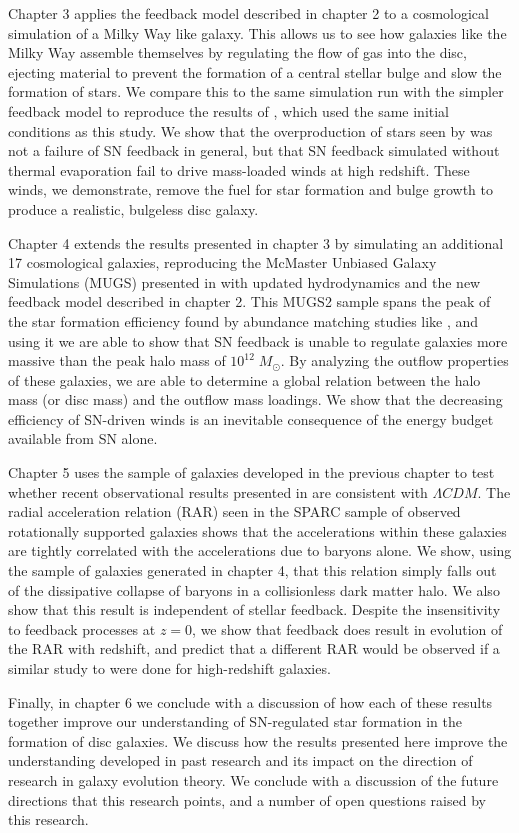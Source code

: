Chapter 3 applies the feedback model described in chapter 2 to a cosmological
simulation of a Milky Way like galaxy.  This allows us to see how galaxies like
the Milky Way assemble themselves by regulating the flow of gas into the disc,
ejecting material to prevent the formation of a central stellar bulge and slow
the formation of stars.  We compare this to the same simulation run with the
simpler \citet{Stinson2006} feedback model to reproduce the results of
\citet{Stinson2010}, which used the same initial conditions as this study.  We
show that the overproduction of stars seen by \citet{Stinson2010} was not a
failure of SN feedback in general, but that SN feedback simulated without 
thermal evaporation fail to drive mass-loaded winds at high redshift.  These
winds, we demonstrate, remove the fuel for star formation and bulge growth to
produce a realistic, bulgeless disc galaxy.

Chapter 4 extends the results presented in chapter 3 by simulating an additional
17 cosmological galaxies, reproducing the McMaster Unbiased Galaxy Simulations
(MUGS) presented in \citet{Stinson2010} with updated hydrodynamics and the new
feedback model described in chapter 2.  This MUGS2 sample spans the peak of the
star formation efficiency found by abundance matching studies like
\citet{Moster2013}, and using it we are able to show that SN feedback is unable
to regulate galaxies more massive than the peak halo mass of $10^{12}\;M_\odot$.
By analyzing the outflow properties of these galaxies, we are able to determine
a global relation between the halo mass (or disc mass) and the outflow mass
loadings.  We show that the decreasing efficiency of SN-driven winds is an
inevitable consequence of the energy budget available from SN alone.

Chapter 5 uses the sample of galaxies developed in the previous chapter to
test whether recent observational results presented in \citet{McGaugh2016}
are consistent with $\Lambda CDM$.  The radial acceleration relation (RAR) seen in
the SPARC sample \citep{Lelli2016b} of observed rotationally supported galaxies
shows that the accelerations within these galaxies are tightly correlated 
with the accelerations due to baryons alone.  We show, using the sample of
galaxies generated in chapter 4, that this relation simply falls out of the
dissipative collapse of baryons in a collisionless dark matter halo.  We also
show that this result is independent of stellar feedback.  Despite the insensitivity
to feedback processes at $z=0$, we show that feedback does result in evolution
of the RAR with redshift, and predict that a different RAR would be observed if
a similar study to \citet{Lelli2016b} were done for high-redshift galaxies.

Finally, in chapter 6 we conclude with a discussion of how each of these results
together improve our understanding of SN-regulated star formation in the
formation of disc galaxies.  We discuss how the results presented here improve
the understanding developed in past research and its impact on the direction of
research in galaxy evolution theory.  We conclude with a discussion of the
future directions that this research points, and a number of open questions
raised by this research.



